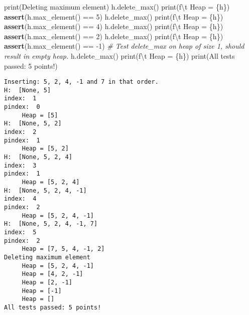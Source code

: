\documentclass[
]{article}
\newenvironment{Shaded}{}{}
\newcommand{\BuiltInTok}[1]{\textcolor[rgb]{0.00,0.50,0.00}{#1}}
\newcommand{\CharTok}[1]{\textcolor[rgb]{0.25,0.44,0.63}{#1}}
\newcommand{\CommentTok}[1]{\textcolor[rgb]{0.38,0.63,0.69}{\textit{#1}}}
\newcommand{\ControlFlowTok}[1]{\textcolor[rgb]{0.00,0.44,0.13}{\textbf{#1}}}
\newcommand{\DecValTok}[1]{\textcolor[rgb]{0.25,0.63,0.44}{#1}}
\newcommand{\NormalTok}[1]{#1}
\newcommand{\OperatorTok}[1]{\textcolor[rgb]{0.40,0.40,0.40}{#1}}
\newcommand{\SpecialCharTok}[1]{\textcolor[rgb]{0.25,0.44,0.63}{#1}}
\newcommand{\SpecialStringTok}[1]{\textcolor[rgb]{0.73,0.40,0.53}{#1}}
\newcommand{\StringTok}[1]{\textcolor[rgb]{0.25,0.44,0.63}{#1}}
\begin{document}
\begin{Shaded}
\begin{Highlighting}[]
\BuiltInTok{print}\NormalTok{(}\StringTok{\textquotesingle{}Deleting maximum element\textquotesingle{}}\NormalTok{)}
\NormalTok{h.delete\_max()}
\BuiltInTok{print}\NormalTok{(}\SpecialStringTok{f\textquotesingle{}}\CharTok{\textbackslash{}t}\SpecialStringTok{ Heap = }\SpecialCharTok{\{}\NormalTok{h}\SpecialCharTok{\}}\SpecialStringTok{\textquotesingle{}}\NormalTok{)}
\ControlFlowTok{assert}\NormalTok{(h.max\_element() }\OperatorTok{==} \DecValTok{5}\NormalTok{)}
\NormalTok{h.delete\_max()}
\BuiltInTok{print}\NormalTok{(}\SpecialStringTok{f\textquotesingle{}}\CharTok{\textbackslash{}t}\SpecialStringTok{ Heap = }\SpecialCharTok{\{}\NormalTok{h}\SpecialCharTok{\}}\SpecialStringTok{\textquotesingle{}}\NormalTok{)}
\ControlFlowTok{assert}\NormalTok{(h.max\_element() }\OperatorTok{==} \DecValTok{4}\NormalTok{)}
\NormalTok{h.delete\_max()}
\BuiltInTok{print}\NormalTok{(}\SpecialStringTok{f\textquotesingle{}}\CharTok{\textbackslash{}t}\SpecialStringTok{ Heap = }\SpecialCharTok{\{}\NormalTok{h}\SpecialCharTok{\}}\SpecialStringTok{\textquotesingle{}}\NormalTok{)}
\ControlFlowTok{assert}\NormalTok{(h.max\_element() }\OperatorTok{==} \DecValTok{2}\NormalTok{)}
\NormalTok{h.delete\_max()}
\BuiltInTok{print}\NormalTok{(}\SpecialStringTok{f\textquotesingle{}}\CharTok{\textbackslash{}t}\SpecialStringTok{ Heap = }\SpecialCharTok{\{}\NormalTok{h}\SpecialCharTok{\}}\SpecialStringTok{\textquotesingle{}}\NormalTok{)}
\ControlFlowTok{assert}\NormalTok{(h.max\_element() }\OperatorTok{==} \OperatorTok{{-}}\DecValTok{1}\NormalTok{)}
\CommentTok{\# Test delete\_max on heap of size 1, should result in empty heap.}
\NormalTok{h.delete\_max()}
\BuiltInTok{print}\NormalTok{(}\SpecialStringTok{f\textquotesingle{}}\CharTok{\textbackslash{}t}\SpecialStringTok{ Heap = }\SpecialCharTok{\{}\NormalTok{h}\SpecialCharTok{\}}\SpecialStringTok{\textquotesingle{}}\NormalTok{)}
\BuiltInTok{print}\NormalTok{(}\StringTok{\textquotesingle{}All tests passed: 5 points!\textquotesingle{}}\NormalTok{)}
\end{Highlighting}
\end{Shaded}

\begin{verbatim}
Inserting: 5, 2, 4, -1 and 7 in that order.
H:  [None, 5]
index:  1
pindex:  0
	 Heap = [5]
H:  [None, 5, 2]
index:  2
pindex:  1
	 Heap = [5, 2]
H:  [None, 5, 2, 4]
index:  3
pindex:  1
	 Heap = [5, 2, 4]
H:  [None, 5, 2, 4, -1]
index:  4
pindex:  2
	 Heap = [5, 2, 4, -1]
H:  [None, 5, 2, 4, -1, 7]
index:  5
pindex:  2
	 Heap = [7, 5, 4, -1, 2]
Deleting maximum element
	 Heap = [5, 2, 4, -1]
	 Heap = [4, 2, -1]
	 Heap = [2, -1]
	 Heap = [-1]
	 Heap = []
All tests passed: 5 points!
\end{verbatim}
\end{document}
